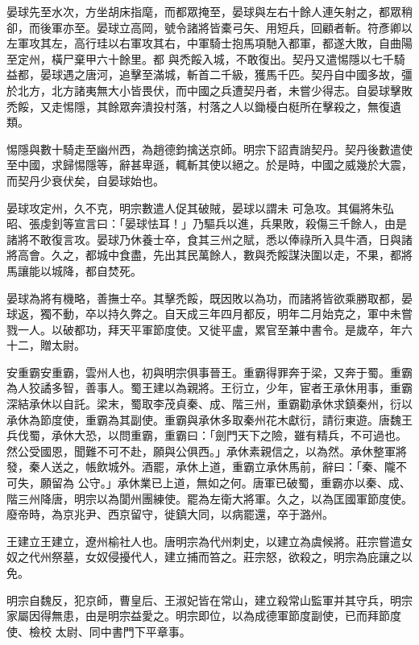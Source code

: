 \begin{pinyinscope}
 晏球先至水次，方坐胡床指麾，而都眾掩至，晏球與左右十餘人連矢射之，都眾稍卻，而後軍亦至。晏球立高岡，號令諸將皆橐弓矢、用短兵，回顧者斬。符彥卿以左軍攻其左，高行珪以右軍攻其右，中軍騎士抱馬項馳入都軍，都遂大敗，自曲陽至定州，橫尸棄甲六十餘里。都
 與禿餒入城，不敢復出。契丹又遣惕隱以七千騎益都，晏球遇之唐河，追擊至滿城，斬首二千級，獲馬千匹。契丹自中國多故，彊於北方，北方諸夷無大小皆畏伏，而中國之兵遭契丹者，未嘗少得志。自晏球擊敗禿餒，又走惕隱，其餘眾奔潰投村落，村落之人以鋤櫌白梃所在擊殺之，無復遺類。



 惕隱與數十騎走至幽州西，為趙德鈞擒送京師。明宗下詔責誚契丹。契丹後數遣使至中國，求歸惕隱等，辭甚卑遜，輒斬其使以絕之。於是時，中國之威幾於大震，而契丹少衰伏矣，自晏球始也。



 晏球攻定州，久不克，明宗數遣人促其破賊，晏球以謂未
 可急攻。其偏將朱弘昭、張虔釗等宣言曰：「晏球怯耳！」乃驅兵以進，兵果敗，殺傷三千餘人，由是諸將不敢復言攻。晏球乃休養士卒，食其三州之賦，悉以俸祿所入具牛酒，日與諸將高會。久之，都城中食盡，先出其民萬餘人，數與禿餒謀決圍以走，不果，都將馬讓能以城降，都自焚死。



 晏球為將有機略，善撫士卒。其擊禿餒，既因敗以為功，而諸將皆欲乘勝取都，晏球返，獨不動，卒以持久弊之。自天成三年四月都反，明年二月始克之，軍中未嘗戮一人。以破都功，拜天平軍節度使。又徙平盧，累官至兼中書令。是歲卒，年六十二，贈太尉。



 安重霸安重霸，雲州人也，初與明宗俱事晉王。重霸得罪奔于梁，又奔于蜀。重霸為人狡譎多智，善事人。蜀王建以為親將。王衍立，少年，宦者王承休用事，重霸深結承休以自託。梁末，蜀取李茂貞秦、成、階三州，重霸勸承休求鎮秦州，衍以承休為節度使，重霸為其副使。重霸與承休多取秦州花木獻衍，請衍東遊。唐魏王兵伐蜀，承休大恐，以問重霸，重霸曰：「劍門天下之險，雖有精兵，不可過也。然公受國恩，聞難不可不赴，願與公俱西。」承休素親信之，以為然。承休整軍將發，秦人送之，帳飲城外。酒罷，承休上道，重霸立承休馬前，辭曰：「秦、隴不可失，願留為
 公守。」承休業已上道，無如之何。唐軍已破蜀，重霸亦以秦、成、階三州降唐，明宗以為閬州團練使。罷為左衛大將軍。久之，以為匡國軍節度使。廢帝時，為京兆尹、西京留守，徙鎮大同，以病罷還，卒于潞州。



 王建立王建立，遼州榆社人也。唐明宗為代州刺史，以建立為虞候將。莊宗嘗遣女奴之代州祭墓，女奴侵擾代人，建立捕而笞之。莊宗怒，欲殺之，明宗為庇讓之以免。



 明宗自魏反，犯京師，曹皇后、王淑妃皆在常山，建立殺常山監軍并其守兵，明宗家屬因得無患，由是明宗益愛之。明宗即位，以為成德軍節度副使，已而拜節度使、檢校
 太尉、同中書門下平章事。




\end{pinyinscope}
